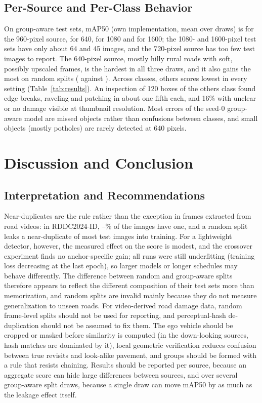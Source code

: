 \documentclass[conference,a4paper]{IEEEtran}
\begin{document}
\subsection{Per-Source and Per-Class Behavior}
On group-aware test sets, mAP50 (own implementation, mean over draws) is \GroupSrcC{} for the 960-pixel source, \GroupSrcA{} for 640, \GroupSrcD{} for 1080 and \GroupSrcE{} for 1600; the 1080- and 1600-pixel test sets have only about 64 and 45 images, and the 720-pixel source has too few test images to report. The 640-pixel source, mostly hilly rural roads with soft, possibly upscaled frames, is the hardest in all three draws, and it also gains the most on random splits (\RandomSrcA{} against \GroupSrcA{}). Across classes, others scores lowest in every setting (Table~\ref{tab:results}). An inspection of 120 boxes of the others class found edge breaks, raveling and patching in about one fifth each, and 16\% with unclear or no damage visible at thumbnail resolution. Most errors of the seed-0 group-aware model are missed objects rather than confusions between classes, and small objects (mostly potholes) are rarely detected at 640 pixels.

\section{Discussion and Conclusion}
\label{sec:discussion}
\subsection{Interpretation and Recommendations}
Near-duplicates are the rule rather than the exception in frames extracted from road videos: in RDDC2024-ID, \PrevStrong--\NDshare\% of the images have one, and a random split leaks a near-duplicate of most test images into training. For a lightweight detector, however, the measured effect on the score is modest, and the crossover experiment finds no anchor-specific gain; all runs were still underfitting (training loss decreasing at the last epoch), so larger models or longer schedules may behave differently. The difference between random and group-aware splits therefore appears to reflect the different composition of their test sets more than memorization, and random splits are invalid mainly because they do not measure generalization to unseen roads. For video-derived road damage data, random frame-level splits should not be used for reporting, and perceptual-hash de-duplication should not be assumed to fix them. The ego vehicle should be cropped or masked before similarity is computed (in the down-looking sources, hash matches are dominated by it), local geometric verification reduces confusion between true revisits and look-alike pavement, and groups should be formed with a rule that resists chaining. Results should be reported per source, because an aggregate score can hide large differences between sources, and over several group-aware split draws, because a single draw can move mAP50 by as much as the leakage effect itself.
\end{document}
